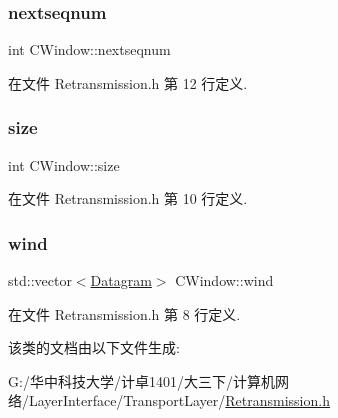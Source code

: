 \subsubsection{\texorpdfstring{nextseqnum}{nextseqnum}}
{\footnotesize\ttfamily int C\+Window\+::nextseqnum}



在文件 Retransmission.\+h 第 12 行定义.

\mbox{\label{class_c_window_a2784e1ec4cb2d6ae7fb90689784eefca}} 
\subsubsection{\texorpdfstring{size}{size}}
{\footnotesize\ttfamily int C\+Window\+::size}



在文件 Retransmission.\+h 第 10 行定义.

\mbox{\label{class_c_window_adcdfe4662a9ee3e2dca546b3fcb1246b}} 
\subsubsection{\texorpdfstring{wind}{wind}}
{\footnotesize\ttfamily std\+::vector$<$\hyperlink{class_datagram}{Datagram}$>$ C\+Window\+::wind}



在文件 Retransmission.\+h 第 8 行定义.



该类的文档由以下文件生成\+:\begin{DoxyCompactItemize}
\item 
G\+:/华中科技大学/计卓1401/大三下/计算机网络/\+Layer\+Interface/\+Transport\+Layer/\hyperlink{_retransmission_8h}{Retransmission.\+h}\end{DoxyCompactItemize}
